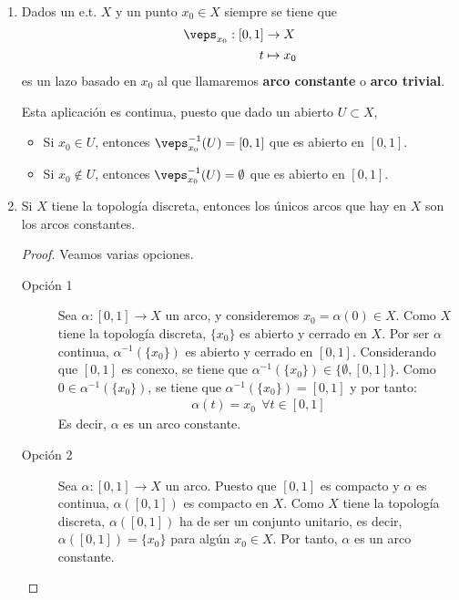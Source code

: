 \begin{ejemplo}\
    \begin{enumerate}
        \item Dados un e.t. $X$ y un punto $x_0\in X$ siempre se tiene que
        \begin{align*}
            \veps_{x_0}:[0,1]&\to X\\
            t &\mapsto x_0
        \end{align*}
        es un lazo basado en $x_0$ al que llamaremos \textbf{arco constante} o \textbf{arco trivial}.

        Esta aplicación es continua, puesto que dado un abierto $U\subset X$,
        \begin{itemize}
            \item Si $x_0\in U$, entonces $\veps_{x_0}^{-1}(U) = [0,1]$ que es abierto en $[0,1]$.
            \item Si $x_0\notin U$, entonces $\veps_{x_0}^{-1}(U) = \emptyset$ que es abierto en $[0,1]$.
        \end{itemize}

        
        \item Si $X$ tiene la topología discreta, entonces los únicos arcos que hay en $X$ son los arcos constantes.
        \begin{proof}
            Veamos varias opciones.
            \begin{description}
                \item[Opción 1] Sea $\alpha:[0,1]\to X$ un arco, y consideremos $x_0 = \alpha(0)\in X$. Como $X$ tiene la topología discreta, $\{x_0\}$ es abierto y cerrado en $X$. Por ser $\alpha$ continua, $\alpha^{-1}(\{x_0\})$ es abierto y cerrado en $[0,1]$. Considerando que $[0,1]$ es conexo, se tiene que $\alpha^{-1}(\{x_0\}) \in \{\emptyset, [0,1]\}$. Como $0\in \alpha^{-1}(\{x_0\})$, se tiene que $\alpha^{-1}(\{x_0\}) = [0,1]$ y por tanto:
                \begin{gather*}
                    \alpha(t) = x_0 \ \ \forall t\in [0,1]
                \end{gather*}
                Es decir, $\alpha$ es un arco constante.

                \item[Opción 2] Sea $\alpha:[0,1]\to X$ un arco. Puesto que $[0,1]$ es compacto y $\alpha$ es continua, $\alpha([0,1])$ es compacto en $X$. Como $X$ tiene la topología discreta, $\alpha([0,1])$ ha de ser un conjunto unitario, es decir, $\alpha([0,1]) = \{x_0\}$ para algún $x_0\in X$. Por tanto, $\alpha$ es un arco constante.
            \end{description}
        \end{proof}



\end{enumerate}
\end{ejemplo}

